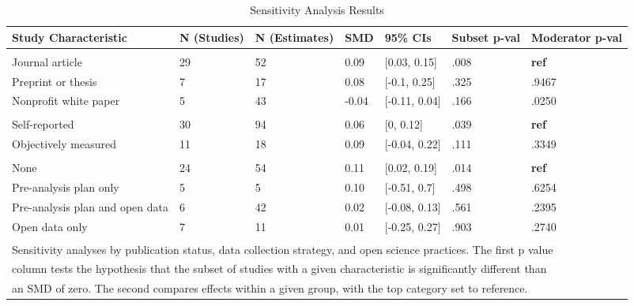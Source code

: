 \documentclass[sn-nature,referee,pdflatex]{sn-jnl}
\begin{document}
\begin{table}[!ht]
\centering
\caption{\label{tab:table_three}Sensitivity Analysis Results}
\centering
\begin{tabular}[t]{lllllll}
\toprule
Study Characteristic & N (Studies) & N (Estimates) & SMD & 95\% CIs & Subset p-val & Moderator p-val\\
\midrule
\addlinespace[0.3em]
\multicolumn{7}{l}{\textbf{Publication Status}}\\
\hspace{1em}Journal article & 29 & 52 & 0.09 & {}[0.03, 0.15] & .008 & \textbf{ref}\\
\hspace{1em}Preprint or thesis & 7 & 17 & 0.08 & {}[-0.1, 0.25] & .325 & .9467\\
\hspace{1em}Nonprofit white paper & 5 & 43 & -0.04 & {}[-0.11, 0.04] & .166 & .0250\\
\addlinespace[0.3em]
\multicolumn{7}{l}{\textbf{Data Collection Strategy}}\\
\hspace{1em}Self-reported & 30 & 94 & 0.06 & {}[0, 0.12] & .039 & \textbf{ref}\\
\hspace{1em}Objectively measured & 11 & 18 & 0.09 & {}[-0.04, 0.22] & .111 & .3349\\
\addlinespace[0.3em]
\multicolumn{7}{l}{\textbf{Open Science}}\\
\hspace{1em}None & 24 & 54 & 0.11 & {}[0.02, 0.19] & .014 & \textbf{ref}\\
\hspace{1em}Pre-analysis plan only & 5 & 5 & 0.10 & {}[-0.51, 0.7] & .498 & .6254\\
\hspace{1em}Pre-analysis plan and open data & 6 & 42 & 0.02 & {}[-0.08, 0.13] & .561 & .2395\\
\hspace{1em}Open data only & 7 & 11 & 0.01 & {}[-0.25, 0.27] & .903 & .2740\\
\bottomrule
\multicolumn{7}{l}{\textsuperscript{} Sensitivity analyses by publication status, data collection strategy, and open science practices. The first p value}\\
\multicolumn{7}{l}{column tests the hypothesis that the subset of studies with a given characteristic is significantly different than}\\
\multicolumn{7}{l}{an SMD of zero. The second compares effects within a given group, with the top category set to reference.}\\
\end{tabular}
\end{table}
\end{document}
